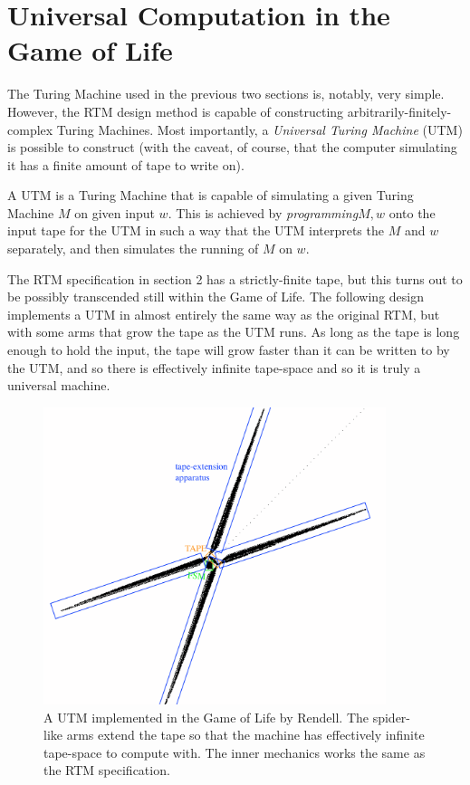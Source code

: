 \documentclass{article}
\begin{document}
\section{Universal Computation in the Game of Life}


The Turing Machine used in the previous two sections is, notably, very simple. However, the RTM design method is capable of constructing arbitrarily-finitely-complex Turing Machines. Most importantly, a \textit{Universal Turing Machine} (UTM) is possible to construct (with the caveat, of course, that the computer simulating it has a finite amount of tape to write on).





A UTM is a Turing Machine that is capable of simulating a given Turing Machine $  M  $ on given input $  w  $. This is achieved by \textit{programming}$  M, w  $ onto the input tape for the UTM in such a way that the UTM interprets the $  M  $ and $  w  $ separately, and then simulates the running of $  M  $ on $  w  $.





The RTM specification in section 2 has a strictly-finite tape, but this turns out to be possibly transcended still within the Game of Life. The following design implements a UTM in almost entirely the same way as the original RTM, but with some arms that grow the tape as the UTM runs. As long as the tape is long enough to hold the input, the tape will grow faster than it can be written to by the UTM, and so there is effectively infinite tape-space and so it is truly a universal machine.



\begin{figure}[h]
\centering
\includegraphics[width=10cm,keepaspectratio]{images/URTM-infinite.png}
\captionsetup{labelformat=empty} \caption{A UTM implemented in the Game of Life by Rendell. The spider-like arms extend the tape so that the machine has effectively infinite tape-space to compute with. The inner mechanics works the same as the RTM specification.}
\end{figure}
\end{document}
